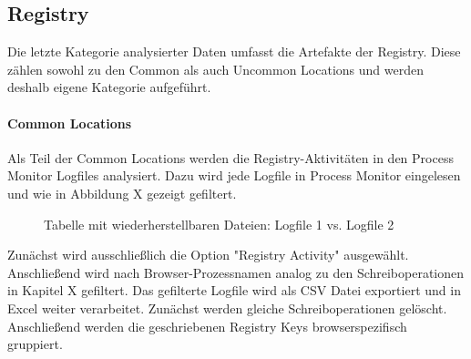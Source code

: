 \subsection{Registry}

Die letzte Kategorie analysierter Daten umfasst die Artefakte der Registry.
Diese zählen sowohl zu den Common als auch Uncommon Locations und werden deshalb eigene Kategorie aufgeführt.

\paragraph*{Common Locations}
Als Teil der Common Locations werden die Registry-Aktivitäten in den Process Monitor Logfiles analysiert.
Dazu wird jede Logfile in Process Monitor eingelesen und wie in Abbildung X gezeigt gefiltert.
\begin{figure}[h!]
	\caption{Tabelle mit wiederherstellbaren Dateien: Logfile 1 vs. Logfile 2}
\end{figure}
Zunächst wird ausschließlich die Option "Registry Activity" ausgewählt.
Anschließend wird nach Browser-Prozessnamen analog zu den Schreiboperationen in Kapitel X gefiltert.
Das gefilterte Logfile wird als CSV Datei exportiert und in Excel weiter verarbeitet.
Zunächst werden gleiche Schreiboperationen gelöscht.
Anschließend werden die geschriebenen Registry Keys browserspezifisch gruppiert.
	
